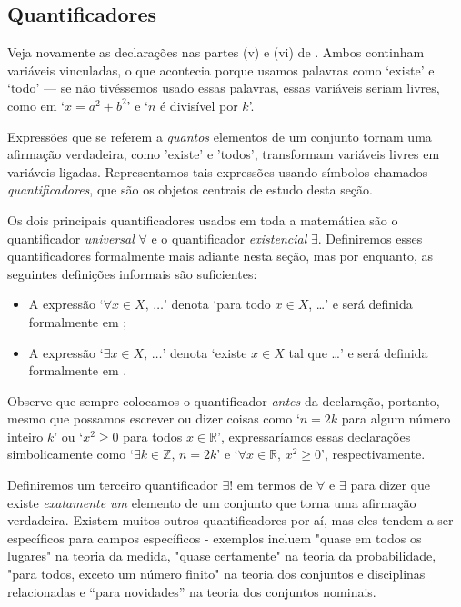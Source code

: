\subsection*{Quantificadores}

Veja novamente as declarações nas partes (v) e (vi) de . Ambos continham variáveis ​​vinculadas, o que acontecia porque usamos palavras como `existe' e `todo' --- se não tivéssemos usado essas palavras, essas variáveis ​​seriam livres, como em `$x=a^2+b^2 $' e `$n$ é divisível por $k$'.

Expressões que se referem a \textit{quantos} elementos de um conjunto tornam uma afirmação verdadeira, como 'existe' e 'todos', transformam variáveis ​​livres em variáveis ​​ligadas. Representamos tais expressões usando símbolos chamados \textit{quantificadores}, que são os objetos centrais de estudo desta seção.

Os dois principais quantificadores usados ​​em toda a matemática são o quantificador \textit{universal} $\forall$ e o quantificador \textit{existencial} $\exists$. Definiremos esses quantificadores formalmente mais adiante nesta seção, mas por enquanto, as seguintes definições informais são suficientes:

\begin{itemize}
\item A expressão `$\forall x \in X,\, \dots{}$' denota `para todo $x \in X$, \dots{}' e será definida formalmente em ;
\item A expressão `$\exists x \in X,\, \dots{}$' denota `existe $x \in X$ tal que \dots{}' e será definida formalmente em .
\end{itemize}

Observe que sempre colocamos o quantificador \textit{antes} da declaração, portanto, mesmo que possamos escrever ou dizer coisas como `$n=2k$ para algum número inteiro $k$' ou `$x^2 \ge 0$ para todos $x \in \mathbb{R}$', expressaríamos essas declarações simbolicamente como `$\exists k \in \mathbb{Z},\, n=2k$' e `$\forall x \in \mathbb{ R},\, x^2 \ge 0$', respectivamente.

Definiremos um terceiro quantificador $\exists !$ em termos de $\forall$ e $\exists$ para dizer que existe \textit{exatamente um} elemento de um conjunto que torna uma afirmação verdadeira. Existem muitos outros quantificadores por aí, mas eles tendem a ser específicos para campos específicos - exemplos incluem "quase em todos os lugares" na teoria da medida, "quase certamente" na teoria da probabilidade, "para todos, exceto um número finito" na teoria dos conjuntos e disciplinas relacionadas e “para novidades” na teoria dos conjuntos nominais.

